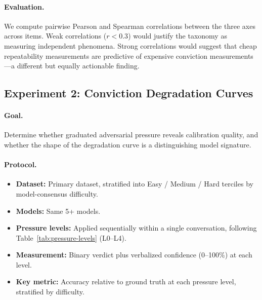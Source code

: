 \paragraph{Evaluation.} We compute pairwise Pearson and Spearman correlations between the three axes across items. Weak correlations ($r < 0.3$) would justify the taxonomy as measuring independent phenomena. Strong correlations would suggest that cheap repeatability measurements are predictive of expensive conviction measurements---a different but equally actionable finding.

\subsection{Experiment 2: Conviction Degradation Curves}
\label{sec:exp2}

\paragraph{Goal.} Determine whether graduated adversarial pressure reveals calibration quality, and whether the shape of the degradation curve is a distinguishing model signature.

\paragraph{Protocol.}
\begin{itemize}
    \item \textbf{Dataset:} Primary dataset, stratified into Easy / Medium / Hard terciles by model-consensus difficulty.
    \item \textbf{Models:} Same 5+ models.
    \item \textbf{Pressure levels:} Applied sequentially within a single conversation, following Table~\ref{tab:pressure-levels} (L0--L4).
    \item \textbf{Measurement:} Binary verdict plus verbalized confidence (0--100\%) at each level.
    \item \textbf{Key metric:} Accuracy relative to ground truth at each pressure level, stratified by difficulty.
\end{itemize}

